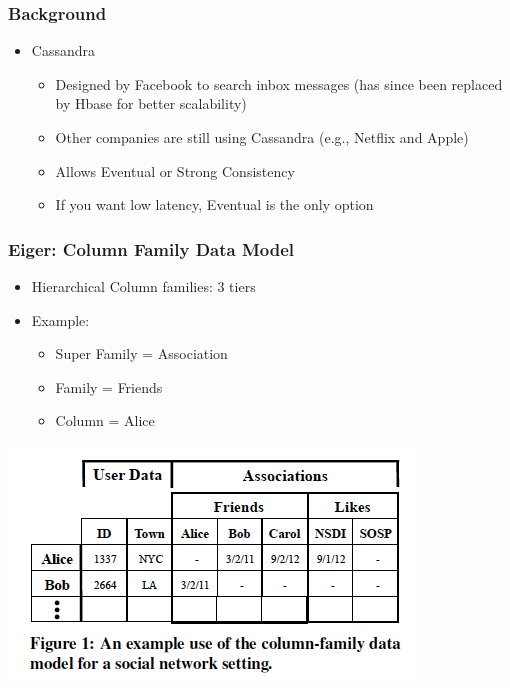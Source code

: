 \documentclass{beamer}
\begin{document}
\begin{frame}
\frametitle{Background}
\begin{itemize}
\pause \item Cassandra
	\begin{itemize}
		\item Designed by Facebook to search inbox messages (has since been replaced by Hbase for better scalability)
		\item Other companies are still using Cassandra (e.g., Netflix and Apple)
		\item Allows Eventual or Strong Consistency
		\item If you want low latency, Eventual is the only option
	\end{itemize}
\end{itemize}  
\end{frame}





\begin{frame}
\frametitle{Eiger: Column Family Data Model}
\begin{itemize}
\item Hierarchical Column families: 3 tiers

\pause \item Example:
	\begin{itemize}
		\item Super Family = Association
		\item Family = Friends
		\item Column = Alice
	\end{itemize}
\end{itemize}  
\includegraphics[scale=0.5]{Figure_Lloyd_ColumnHierarchy.png}
\end{frame}
\end{document}
